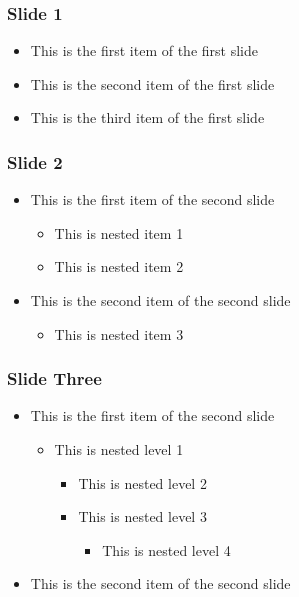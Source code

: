\documentclass[aspectratio=169]{beamer}
\begin{document}
\frame{\titlepage}

\begin{frame}
\frametitle{ Slide 1 }
\begin{itemize}
    \item 
        This is the first item of the first slide
    \item 
        This is the second item of the first slide
    \item 
        This is the third item of the first slide
\end{itemize}
\end{frame}
\begin{frame}
\frametitle{ Slide 2 }
\begin{itemize}
    \item 
        This is the first item of the second slide
    \begin{itemize}
        \item 
            This is nested item 1
        \item 
            This is nested item 2
    \end{itemize}
    \item 
        This is the second item of the second slide
    \begin{itemize}
        \item 
            This is nested item 3
    \end{itemize}
\end{itemize}
\end{frame}
\begin{frame}
\frametitle{ Slide Three }
\begin{itemize}
    \item 
        This is the first item of the second slide
    \begin{itemize}
        \item 
            This is nested level 1
        \begin{itemize}
            \item 
                This is nested level 2
            \item 
                This is nested level 3
            \begin{itemize}
                \item 
                    This is nested level 4
            \end{itemize}
        \end{itemize}
    \end{itemize}
    \item 
        This is the second item of the second slide
\end{itemize}
\end{frame}
\end{document}
